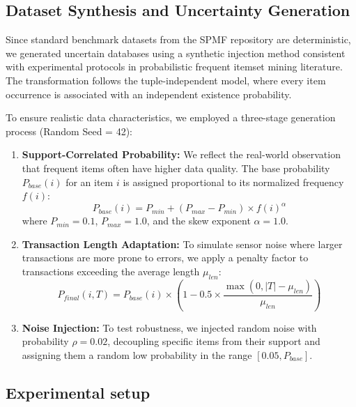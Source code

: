 \documentclass[10pt,letterpaper]{article}
\begin{document}
\subsection*{Dataset Synthesis and Uncertainty Generation}

Since standard benchmark datasets from the SPMF repository are deterministic, we generated uncertain databases using a synthetic injection method consistent with experimental protocols in probabilistic frequent itemset mining literature. The transformation follows the tuple-independent model, where every item occurrence is associated with an independent existence probability.

To ensure realistic data characteristics, we employed a three-stage generation process (Random Seed = 42):

\begin{enumerate}
    \item \textbf{Support-Correlated Probability:} We reflect the real-world observation that frequent items often have higher data quality. The base probability $P_{base}(i)$ for an item $i$ is assigned proportional to its normalized frequency $f(i)$:
    \begin{equation}
        P_{base}(i) = P_{min} + (P_{max} - P_{min}) \times f(i)^\alpha
    \end{equation}
    where $P_{min}=0.1$, $P_{max}=1.0$, and the skew exponent $\alpha=1.0$.

    \item \textbf{Transaction Length Adaptation:} To simulate sensor noise where larger transactions are more prone to errors, we apply a penalty factor to transactions exceeding the average length $\mu_{len}$:
    \begin{equation}
        P_{final}(i, T) = P_{base}(i) \times \left(1 - 0.5 \times \frac{\max(0, |T| - \mu_{len})}{\mu_{len}}\right)
    \end{equation}

    \item \textbf{Noise Injection:} To test robustness, we injected random noise with probability $\rho=0.02$, decoupling specific items from their support and assigning them a random low probability in the range $[0.05, P_{base}]$.
\end{enumerate}

\subsection*{Experimental setup}
\end{document}
